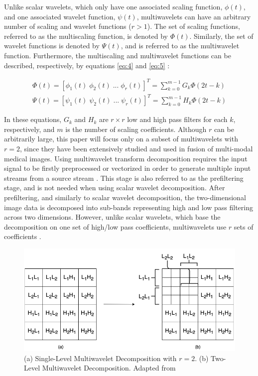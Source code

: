 \documentclass{article}
\begin{document}
Unlike scalar wavelets, which only have one associated scaling function, $\phi(t)$, and one associated wavelet function, $\psi(t)$, multiwavelets can have an arbitrary number of scaling and wavelet functions ($r > 1$). The set of scaling functions, referred to as the multiscaling function, is denoted by $\Phi(t)$. Similarly, the set of wavelet functions is denoted by $\Psi(t)$, and is referred to as the multiwavelet function. Furthermore, the multiscaling and multiwavelet functions can be described, respectively, by equations \ref{eq:4} and \ref{eq:5} \cite{Wang2004}:

\begin{gather}\label{eq:4}
 \Phi(t) = [\phi_1(t)\; \phi_2(t)\;...\;\phi_r(t)]^T = \sum_{k=0}^{m-1} G_k \Phi(2t-k) \\\label{eq:5}
  \Psi(t) = [\psi_1(t)\; \psi_2(t)\;...\;\psi_r(t)]^T = \sum_{k=0}^{m-1} H_k \Phi(2t-k)
\end{gather}

In these equations, $G_k$ and $H_k$ are $r \times r$ low and high pass filters for each $k$, respectively, and $m$ is the number of scaling coefficients. Although $r$ can be arbitrarily large, this paper will focus only on a subset of multiwavelets with $r = 2$, since they have been extensively studied and used in fusion of multi-modal medical images.
Using multiwavelet transform decomposition requires the input signal to be firstly preprocessed or vectorized in order to generate multiple input streams from a source stream \cite{Wang2004, Liu2010}. This stage is also referred to as the prefiltering stage, and is not needed when using scalar wavelet decomposition.
After prefiltering, and similarly to scalar wavelet decomposition, the two-dimensional image data is decomposed into sub-bands representing high and low pass filtering across two dimensions. However, unlike scalar wavelets, which base the decomposition on one set of high/low pass coefficients, multiwavelets use $r$ sets of coefficients \cite{Wang2004}.

    \begin{figure}[hbt!]
        \centering
        \includegraphics[width=\linewidth]{Img/Multiwavelet.png}
        \caption{(a) Single-Level Multiwavelet Decomposition with $r = 2$. (b) Two-Level Multiwavelet Decomposition. Adapted from \cite{Wang2004}}
        \label{multiwavelet}
    \end{figure}
\end{document}
